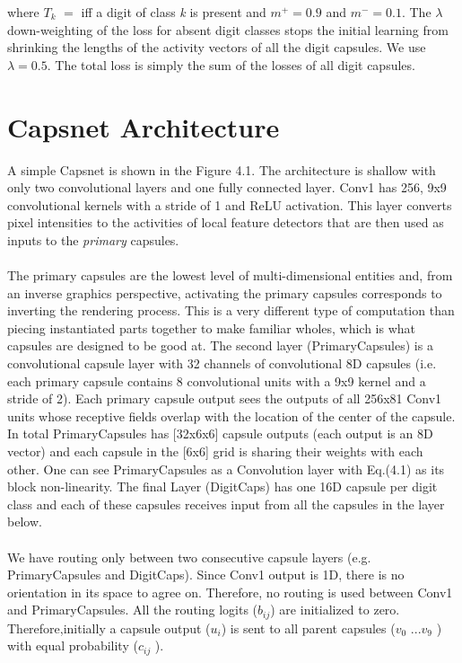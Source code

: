 \documentclass[a4paper,12pt]{report}
\begin{document}
where $T_k$ $=$ iff a digit of class \textit{k} is present and $m^{+} = 0.9$ and $m^{-}=0.1$. The $\lambda$ down-weighting
of the loss for absent digit classes stops the initial learning from shrinking the lengths of the activity vectors of all the digit capsules. We use $\lambda=0.5$. The total loss is simply the sum of the losses of all digit capsules.

\section{Capsnet Architecture}
A simple Capsnet is shown in the Figure 4.1. The architecture is shallow with only two convolutional layers and one fully connected layer. Conv1 has 256, 9x9 convolutional kernels with a stride of 1 and ReLU activation. This layer converts pixel intensities to the activities of local feature detectors that are then used as inputs to the \textit{primary} capsules.

\paragraph{}
The primary capsules are the lowest level of multi-dimensional entities and, from an inverse graphics perspective, activating the primary capsules corresponds to inverting the rendering process. This is a very different type of computation than piecing instantiated parts together to make familiar wholes, which is what capsules are designed to be good at. The second layer (PrimaryCapsules) is a convolutional capsule layer with 32 channels of convolutional 8D capsules (i.e. each primary capsule contains 8 convolutional units with a 9x9 kernel and a stride of 2). Each primary capsule output sees the outputs of all 256x81 Conv1 units whose receptive fields overlap with the location of the center of the capsule. In total PrimaryCapsules has [32x6x6] capsule outputs (each output is an 8D vector) and each capsule in the [6x6] grid is sharing their weights with each other. One can see PrimaryCapsules as a Convolution layer with Eq.(4.1) as its block non-linearity. The final Layer (DigitCaps) has one 16D capsule per digit class and each of these capsules receives input from all the capsules in the layer below.

\paragraph{}
We have routing only between two consecutive capsule layers (e.g. PrimaryCapsules and DigitCaps). Since Conv1 output is 1D, there is no orientation in its space to agree on. Therefore, no routing is used between Conv1 and PrimaryCapsules. All the routing logits ($b_{ij}$) are initialized to zero. Therefore,initially a capsule output ($u_i$) is sent to all parent capsules ($v_0$ ...$v_9$ ) with equal probability ($c_{ij}$ ).
\end{document}
